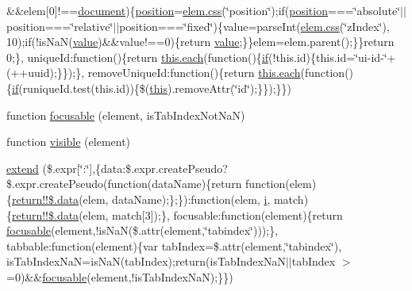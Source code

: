 \begin{DoxyCompactItemize}
\&\&elem\mbox{[}0\mbox{]}!==\hyperlink{outside_events_8js_aa14f8e0338cced6720590fd2ea13bd4b}{document})\{\hyperlink{jquery-ui_8js_a5cd004409a854f3c106e2c3424b89292}{position}=\hyperlink{extras_2_scroller_2media_2docs_2media_2js_2jquery_8js_a7f3289748d8b48665399d82540f341dd}{elem.\+css}(\char`\"{}position\char`\"{});if(\hyperlink{jquery-ui_8js_a5cd004409a854f3c106e2c3424b89292}{position}===\char`\"{}absolute\char`\"{}$\vert$$\vert$position===\char`\"{}relative\char`\"{}$\vert$$\vert$position===\char`\"{}fixed\char`\"{})\{value=parse\+Int(\hyperlink{extras_2_scroller_2media_2docs_2media_2js_2jquery_8js_a7f3289748d8b48665399d82540f341dd}{elem.\+css}(\char`\"{}z\+Index\char`\"{}), 10);if(!is\+Na\+N(\hyperlink{fullpage_2plugin_8min_8js_ac56c57897e10f699d124e0103921aa20}{value})\&\&value!==0)\{return \hyperlink{fullpage_2plugin_8min_8js_ac56c57897e10f699d124e0103921aa20}{value};\}\}elem=elem.\+parent();\}\}return 0;\}, unique\+Id\+:function()\{return \hyperlink{fullpage_2plugin_8min_8js_a536422939f8cd6b5867a8fb424c3c02e}{this.\+each}(function()\{\hyperlink{fullpage_2plugin_8js_a8b98017e64ef036adb9ae327ff94abe1}{if}(!this.\+id)\{this.\+id=\char`\"{}ui-\/id-\/\char`\"{}+(++uuid);\}\});\}, remove\+Unique\+Id\+:function()\{return \hyperlink{fullpage_2plugin_8min_8js_a536422939f8cd6b5867a8fb424c3c02e}{this.\+each}(function()\{\hyperlink{fullpage_2plugin_8js_a8b98017e64ef036adb9ae327ff94abe1}{if}(runique\+Id.\+test(this.\+id))\{\$(\hyperlink{tinymce_8jquery_8dev_8js_a05c09a5e9d53fa7adf0a7936038c2fa3}{this}).remove\+Attr(\char`\"{}id\char`\"{});\}\});\}\})
\item 
function \hyperlink{jquery-ui_8js_a73c44526962043c196427080336ec057}{focusable} (element, is\+Tab\+Index\+Not\+Na\+N)
\item 
function \hyperlink{jquery-ui_8js_a126cbab38e8e97b043381925aef67b43}{visible} (element)
\item 
\hyperlink{jquery-ui_8js_a893cc767bdbe002b521bcd5f91d48882}{extend} (\$.expr\mbox{[}\char`\"{}\+:\char`\"{}\mbox{]},\{data\+:\$.\+expr.\+create\+Pseudo?\$.expr.\+create\+Pseudo(function(data\+Name)\{return function(elem)\{\hyperlink{fullpage_2plugin_8js_a718c1bf5a3bf21ebb980203b142e5b75}{return!!\$.\+data}(elem, data\+Name);\};\})\+:function(elem, \hyperlink{validate_8js_a5e25b1d1bed9ab5f3174b76d6a722180}{i}, match)\{\hyperlink{fullpage_2plugin_8js_a718c1bf5a3bf21ebb980203b142e5b75}{return!!\$.\+data}(elem, match\mbox{[}3\mbox{]});\}, focusable\+:function(element)\{return \hyperlink{jquery-ui_8js_a73c44526962043c196427080336ec057}{focusable}(element,!is\+Na\+N(\$.attr(element,\char`\"{}tabindex\char`\"{})));\}, tabbable\+:function(element)\{var tab\+Index=\$.attr(element,\char`\"{}tabindex\char`\"{}), is\+Tab\+Index\+Na\+N=is\+Na\+N(tab\+Index);return(is\+Tab\+Index\+Na\+N$\vert$$\vert$tab\+Index $>$=0)\&\&\hyperlink{jquery-ui_8js_a73c44526962043c196427080336ec057}{focusable}(element,!is\+Tab\+Index\+Na\+N);\}\})
$$
\end{DoxyCompactItemize}

